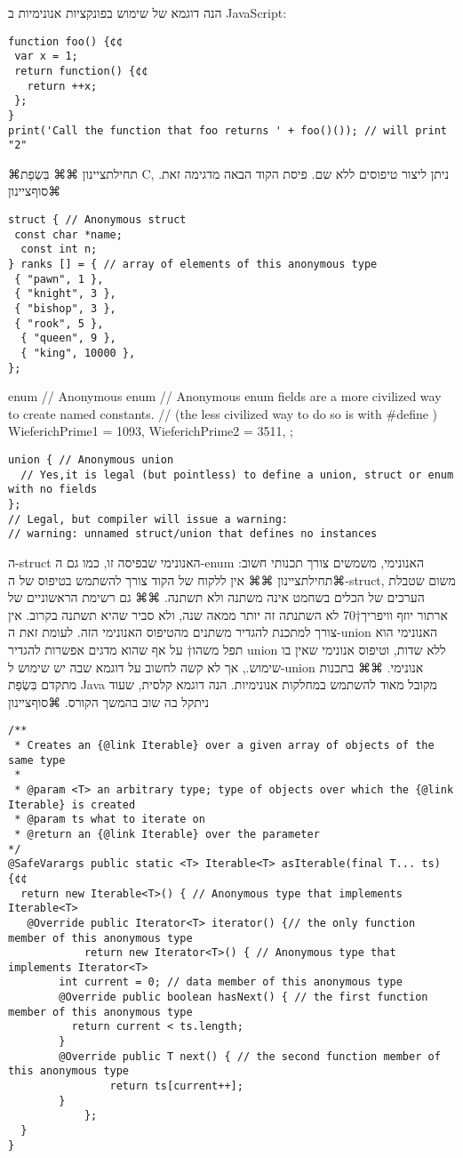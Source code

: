 הנה דוגמא של שימוש בפונקציות אנונימיות ב JavaScript:
\begin{verbatim}
function foo() {¢¢
 var x = 1;
 return function() {¢¢
   return ++x;
 };
}
print('Call the function that foo returns ' + foo()()); // will print "2"
\end{verbatim}

      ⌘תחילת{ציינון}
      ⌘⌘ בִּשְׂפַת C, ניתן ליצור טיפוסים ללא שם. פיסת הקוד הבאה מדגימה זאת.
    ⌘סוף{ציינון}
\begin{verbatim}
struct { // Anonymous struct
 const char *name;
  const int n;
} ranks [] = { // array of elements of this anonymous type
 { "pawn", 1 },
 { "knight", 3 },
 { "bishop", 3 },
 { "rook", 5 },
  { "queen", 9 },
  { "king", 10000 },
};
\end{verbatim}


\begin{CPP}
enum { // Anonymous enum
 // Anonymous enum fields are a more civilized way to create named constants.
  // (the less civilized way to do so is with #define )
  WieferichPrime1 = 1093,
  WieferichPrime2 = 3511,
};
\end{CPP}


\begin{verbatim}
union { // Anonymous union
  // Yes,it is legal (but pointless) to define a union, struct or enum with no fields
};
// Legal, but compiler will issue a warning:
// warning: unnamed struct/union that defines no instances
\end{verbatim}

      ה-struct האנונימי שבפיסה זו, כמו גם ה-enum האנונימי, משמשים צורך תכנותי חשוב:
      ⌘תחילת{ציינון}
      ⌘⌘ אין ללקוח של הקוד צורך להשתמש בטיפוס של ה-struct, משום שטבלת הערכים של הכלים בשחמט אינה משתנה ולא תשתנה.
      ⌘⌘ גם רשימת הראשוניים של ארתור יוזף וויפריך†{70} לא השתנתה זה יותר ממאה שנה, ולא סביר שהיא תשתנה בקרוב. אין צורך למתכנת להגדיר משתנים מהטיפוס האנונימי הזה.
      לעומת זאת ה-union האנונימי הוא תפל משהו†{ על אף שהוא מדגים אפשרות להגדיר union ללא שדות, וטיפוס אנונימי שאין בו שימוש.}, אך לא קשה לחשוב על דוגמא שבה יש שימוש ל-union אנונימי.
      ⌘⌘ בתכנות מתקדם בִּשְׂפַת Java מקובל מאוד להשתמש במחלקות אנונימיות. הנה דוגמא קלסית, שעוד ניתקל בה שוב בהמשך הקורס.
    ⌘סוף{ציינון}
\begin{verbatim}
/**
 * Creates an {@link Iterable} over a given array of objects of the same type
 *
 * @param <T> an arbitrary type; type of objects over which the {@link Iterable} is created
 * @param ts what to iterate on
 * @return an {@link Iterable} over the parameter
*/
@SafeVarargs public static <T> Iterable<T> asIterable(final T... ts) {¢¢
  return new Iterable<T>() { // Anonymous type that implements Iterable<T>
   @Override public Iterator<T> iterator() {// the only function member of this anonymous type
            return new Iterator<T>() { // Anonymous type that implements Iterator<T>
        int current = 0; // data member of this anonymous type
        @Override public boolean hasNext() { // the first function member of this anonymous type
          return current < ts.length;
        }
        @Override public T next() { // the second function member of this anonymous type
                return ts[current++];
        }
            };
  }
}
\end{verbatim}

